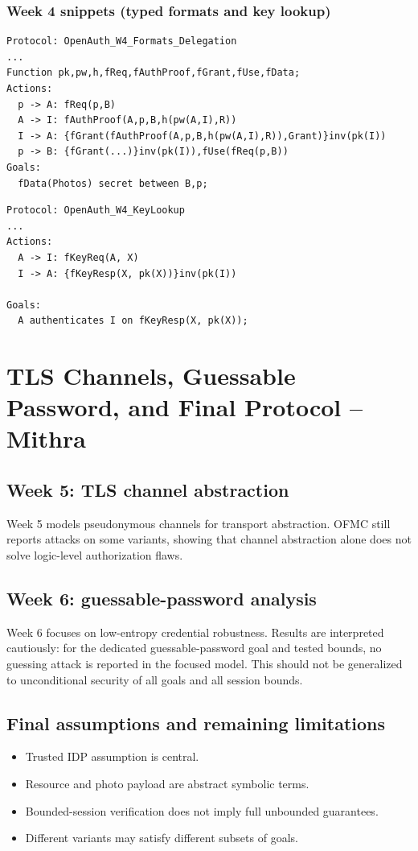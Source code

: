 \documentclass[11pt,a4paper]{article}
\begin{document}
\subsubsection{Week 4 snippets (typed formats and key lookup)}
\begin{lstlisting}
Protocol: OpenAuth_W4_Formats_Delegation
...
Function pk,pw,h,fReq,fAuthProof,fGrant,fUse,fData;
Actions:
  p -> A: fReq(p,B)
  A -> I: fAuthProof(A,p,B,h(pw(A,I),R))
  I -> A: {fGrant(fAuthProof(A,p,B,h(pw(A,I),R)),Grant)}inv(pk(I))
  p -> B: {fGrant(...)}inv(pk(I)),fUse(fReq(p,B))
Goals:
  fData(Photos) secret between B,p;
\end{lstlisting}

\begin{lstlisting}
Protocol: OpenAuth_W4_KeyLookup
...
Actions:
  A -> I: fKeyReq(A, X)
  I -> A: {fKeyResp(X, pk(X))}inv(pk(I))

Goals:
  A authenticates I on fKeyResp(X, pk(X));
\end{lstlisting}

\section{TLS Channels, Guessable Password, and Final Protocol -- Mithra}
\subsection{Week 5: TLS channel abstraction}
Week 5 models pseudonymous channels for transport abstraction.
OFMC still reports attacks on some variants, showing that channel abstraction alone does not solve logic-level authorization flaws.

\subsection{Week 6: guessable-password analysis}
Week 6 focuses on low-entropy credential robustness.
Results are interpreted cautiously: for the dedicated guessable-password goal and tested bounds, no guessing attack is reported in the focused model.
This should not be generalized to unconditional security of all goals and all session bounds.

\subsection{Final assumptions and remaining limitations}
\begin{itemize}[leftmargin=1.2em]
  \item Trusted IDP assumption is central.
  \item Resource and photo payload are abstract symbolic terms.
  \item Bounded-session verification does not imply full unbounded guarantees.
  \item Different variants may satisfy different subsets of goals.
\end{itemize}
\end{document}
